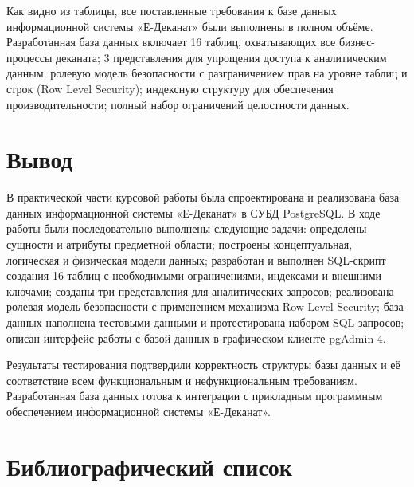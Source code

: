 \documentclass[14pt, a4paper]{extreport}
\begin{document}
Как видно из таблицы, все поставленные требования к базе данных информационной системы «Е-Деканат» были выполнены в полном объёме. Разработанная база данных включает 16 таблиц, охватывающих все бизнес-процессы деканата; 3 представления для упрощения доступа к аналитическим данным; ролевую модель безопасности с разграничением прав на уровне таблиц и строк (Row Level Security); индексную структуру для обеспечения производительности; полный набор ограничений целостности данных.

\chapter*{Вывод}

В практической части курсовой работы была спроектирована и реализована база данных информационной системы «Е-Деканат» в СУБД PostgreSQL. В ходе работы были последовательно выполнены следующие задачи: определены сущности и атрибуты предметной области; построены концептуальная, логическая и физическая модели данных; разработан и выполнен SQL-скрипт создания 16 таблиц с необходимыми ограничениями, индексами и внешними ключами; созданы три представления для аналитических запросов; реализована ролевая модель безопасности с применением механизма Row Level Security; база данных наполнена тестовыми данными и протестирована набором SQL-запросов; описан интерфейс работы с базой данных в графическом клиенте pgAdmin 4.

Результаты тестирования подтвердили корректность структуры базы данных и её соответствие всем функциональным и нефункциональным требованиям. Разработанная база данных готова к интеграции с прикладным программным обеспечением информационной системы «Е-Деканат».

\chapter*{Библиографический список}
\end{document}
